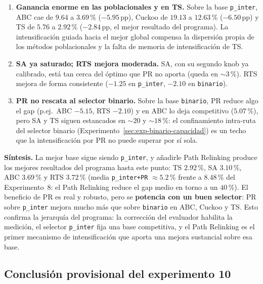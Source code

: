 \begin{enumerate}
\item \textbf{Ganancia enorme en las poblacionales y en TS.} Sobre la base
  \texttt{p\_inter}, ABC cae de $9.64$ a $3.69$\,\% ($-5.95$\,pp), Cuckoo de
  $19.13$ a $12.63$\,\% ($-6.50$\,pp) y TS de $5.76$ a $2.92$\,\% ($-2.84$\,pp,
  el mejor resultado del programa).
  La intensificación guiada hacia el mejor global compensa la dispersión propia
  de los métodos poblacionales y la falta de memoria de intensificación de TS.
\item \textbf{SA ya saturado; RTS mejora moderada.} SA, con su segundo knob ya
  calibrado, está tan cerca del óptimo que PR no aporta (queda en $\sim$$3$\,\%).
  RTS mejora de forma consistente ($-1.25$ en \texttt{p\_inter}, $-2.10$ en
  \texttt{binario}).
\item \textbf{PR no rescata al selector binario.} Sobre la base \texttt{binario},
  PR reduce algo el gap (p.ej.\ ABC $-5.15$, RTS $-2.10$) y en ABC lo deja
  competitivo ($5.07$\,\%), pero SA y TS siguen estancados en $\sim$$20$ y
  $\sim$$18$\,\%: el confinamiento intra-ruta del selector binario
  (Experimento~\ref{sec:exp-binario-capacidad}) es un techo que la
  intensificación por PR no puede superar por sí sola.
\end{enumerate}

\noindent\textbf{Síntesis.} La mejor base sigue siendo \texttt{p\_inter}, y
añadirle Path Relinking produce los mejores resultados del programa hasta este
punto: TS $2.92$\,\%, SA $3.10$\,\%, ABC $3.69$\,\% y RTS $3.72$\,\%
(media \texttt{p\_inter+PR} $\approx 5.2$\,\% frente a $8.48$\,\% del
Experimento~8: el Path Relinking reduce el gap medio en torno a un $40$\,\%). El beneficio de PR es real y robusto, pero se \textbf{potencia con un
buen selector}: PR sobre \texttt{p\_inter} mejora mucho más que sobre
\texttt{binario} en ABC, Cuckoo y TS. Esto confirma la jerarquía del programa:
la corrección del evaluador habilita la medición, el selector
\texttt{p\_inter} fija una base competitiva, y el Path Relinking es el primer
mecanismo de intensificación que aporta una mejora sustancial sobre esa base.

\subsection{Conclusión provisional del experimento 10}


